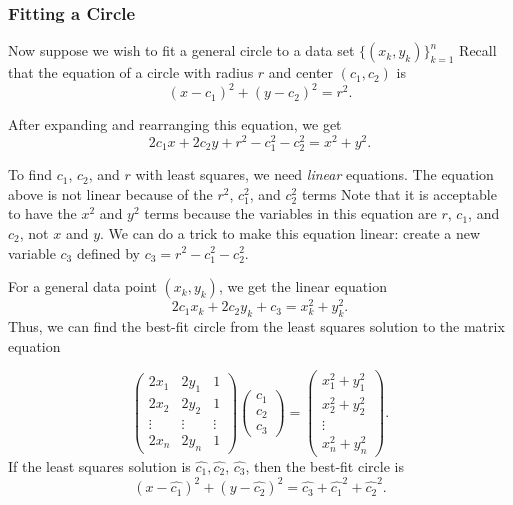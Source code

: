 \subsubsection*{Fitting a Circle} %

Now suppose we wish to fit a general circle to a data set $\{(x_k, y_k)\}_{k=1}^n$
Recall that the equation of a circle with radius $r$ and center $(c_1,c_2)$ is
\begin{equation}
\label{circle}
(x-c_1)^2 + (y-c_2)^2 = r^2.
\end{equation}

After expanding and rearranging this equation, we get
\begin{equation*}
\label{circle2}
2c_1x + 2c_2y + r^2 - c_1^2 - c_2^2 = x^2 + y^2.
\end{equation*}

To find $c_1$, $c_2$, and $r$ with least squares, we need \emph{linear} equations.
The equation above is not linear because of the $r^2$, $c_1^2$, and $c_2^2$ terms
Note that it is acceptable to have the $x^2$ and $y^2$ terms because the variables in this equation are $r$, $c_1$, and $c_2$, not $x$ and $y$.
We can do a trick to make this equation linear: create a new variable $c_3$ defined by $c_3 = r^2-c_1^2-c_2^2$.

For a general data point $(x_k, y_k)$, we get the linear equation
\begin{equation*}
2c_1x_k+2c_2y_k+c_3=x_k^2+y_k^2.
\end{equation*}
Thus, we can find the best-fit circle from the least squares solution to the matrix equation

\begin{equation}\label{equ:circle_fit}
\begin{pmatrix}
2 x_1 & 2 y_1 & 1\\
2 x_2 & 2 y_2 & 1\\
\vdots & \vdots & \vdots \\
2 x_n & 2 y_n & 1
\end{pmatrix}
\begin{pmatrix}
c_1\\
c_2\\
c_3
\end{pmatrix}=
\begin{pmatrix}
x_1^2 + y_1^2\\
x_2^2 + y_2^2\\
\vdots\\
x_n^2 + y_n^2
\end{pmatrix}.
\end{equation}
If the least squares solution is $\widehat{c_1}, \widehat{c_2}$, $\widehat{c_3}$, then the best-fit circle is
\[
(x-\widehat{c_1})^2 + (y-\widehat{c_2})^2 = \widehat{c_3}+\widehat{c_1}^2+\widehat{c_2}^2.
\]

